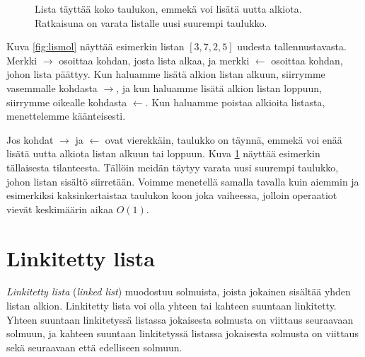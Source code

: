 \begin{figure}
\center
{}
\caption{Lista täyttää koko taulukon, emmekä voi lisätä uutta alkiota.
Ratkaisuna on varata listalle uusi suurempi taulukko.}
\label{fig:lismol2}
\end{figure}

Kuva \ref{fig:lismol} näyttää esimerkin listan $[3,7,2,5]$
uudesta tallennustavasta.
Merkki $\rightarrow$ osoittaa kohdan, josta lista alkaa,
ja merkki $\leftarrow$ osoittaa kohdan, johon lista päättyy.
Kun haluamme lisätä alkion listan alkuun,
siirrymme vasemmalle kohdasta $\rightarrow$,
ja kun haluamme lisätä alkion listan loppuun,
siirrymme oikealle kohdasta $\leftarrow$.
Kun haluamme poistaa alkioita listasta,
menettelemme käänteisesti.

Jos kohdat $\rightarrow$ ja $\leftarrow$ ovat vierekkäin,
taulukko on täynnä, emmekä voi enää lisätä uutta alkiota
listan alkuun tai loppuun.
Kuva \ref{fig:lismol2} näyttää esimerkin tällaisesta tilanteesta.
Tällöin meidän täytyy varata uusi suurempi taulukko,
johon listan sisältö siirretään.
Voimme menetellä samalla tavalla kuin aiemmin ja
esimerkiksi kaksinkertaistaa taulukon koon joka vaiheessa,
jolloin operaatiot vievät keskimäärin aikaa $O(1)$.

\section{Linkitetty lista}


\emph{Linkitetty lista} (\emph{linked list}) muodostuu solmuista, joista jokainen sisältää
yhden listan alkion.
Linkitetty lista voi olla yhteen tai kahteen suuntaan linkitetty.
Yhteen suuntaan linkitetyssä listassa jokaisesta solmusta
on viittaus seuraavaan solmuun, ja kahteen suuntaan linkitetyssä
listassa jokaisesta solmusta on viittaus sekä seuraavaan että edelliseen solmuun.

